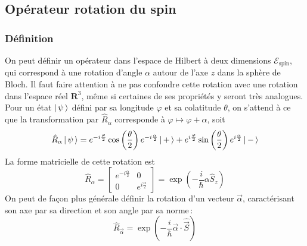 


    \subsection{Opérateur rotation du spin}

        \subsubsection{Définition}

        On peut définir un opérateur dans l’espace de Hilbert à deux dimensions $\mathcal{E}_{\text{spin}}$, qui correspond à une rotation d’angle $\alpha$ autour de l’axe $z$ dans la sphère de Bloch. Il faut faire attention à ne pas confondre cette rotation avec une rotation dans l’espace réel $\mathbf{R}^3$, même si certaines de ses propriétés y seront très analogues. Pour un état $\left| \, \psi \, \right>$ défini par sa longitude $\varphi$ et sa colatitude $\theta$, on s’attend à ce que la transformation par $\hat{R}_{\alpha}$ corresponde à $\varphi \mapsto \varphi + \alpha$, soit 
        \[ \hat{R}_{\alpha} \left| \, \psi \, \right> = e^{- i \frac{\varphi}{2}} \cos\left(\frac{\theta}{2}\right) e^{-i \frac{\alpha}{2}} \left| \, + \, \right> + e^{i \frac{\varphi}{2}} \sin\left(\frac{\theta}{2}\right) e^{i \frac{\alpha}{2}}\left| \, - \, \right> \]
        La forme matricielle de cette rotation est 
        \[ \hat{R}_{\alpha} = \begin{bmatrix}
            e^{-i \frac{\alpha}{2}} & 0 \\
            0 & e^{i \frac{\alpha}{2}}
        \end{bmatrix} = \exp\left(- \frac{i}{\hbar} \alpha \hat{S}_z\right) \]
        On peut de façon plus générale définir la rotation d’un vecteur $\vec{\alpha}$, caractérisant son axe par sa direction et son angle par sa norme :
        \[ \hat{R}_{\vec{\alpha}} = \exp\left(- \frac{i}{\hbar}\vec{\alpha} \cdot \hat{\vec{S}}\right) \]

